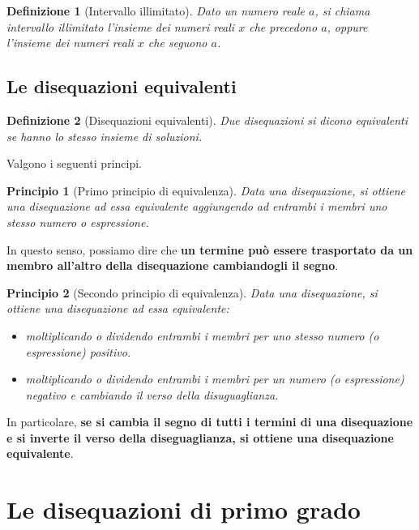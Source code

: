 \documentclass[12pt, letterpaper]{article}
\newtheorem{definition}{Definizione}[section]
\newtheorem{principle}{Principio}
\begin{document}
	\begin{definition}[Intervallo illimitato]
		Dato un numero reale $a$, si chiama intervallo illimitato l'insieme dei numeri reali $x$ che precedono $a$, oppure l'insieme dei numeri reali $x$ che seguono $a$.
	\end{definition}

	\subsection{Le disequazioni equivalenti}
	
	\begin{definition}[Disequazioni equivalenti]
		Due disequazioni si dicono equivalenti se hanno lo stesso insieme di soluzioni.
	\end{definition}

	Valgono i seguenti principi.
	
	\begin{principle}[Primo principio di equivalenza]
		Data una disequazione, si ottiene una disequazione ad essa equivalente aggiungendo ad entrambi i membri uno stesso numero o espressione.
	\end{principle}

	In questo senso, possiamo dire che \textbf{un termine può essere trasportato da un membro all'altro della disequazione cambiandogli il segno}.
	
	\begin{principle}[Secondo principio di equivalenza]
		
		Data una disequazione, si ottiene una disequazione ad essa equivalente:
		
		\begin{itemize}
			\item moltiplicando o dividendo entrambi i membri per uno stesso numero (o espressione) \textit{positivo}.
			\item moltiplicando o dividendo entrambi i membri per un numero (o espressione) \textit{negativo} e \textit{cambiando il verso} della disuguaglianza.
		\end{itemize}
	
	\end{principle}
	
	In particolare, \textbf{se si cambia il segno di tutti i termini di una disequazione e si inverte il verso della diseguaglianza, si ottiene una disequazione equivalente}.
	
	\section{Le disequazioni di primo grado}
	
\end{document}
